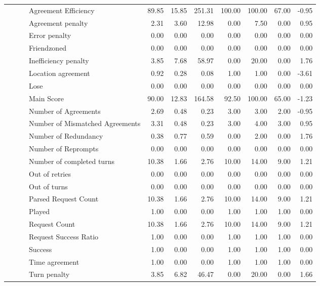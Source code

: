 \begin{tabular}{llllrrrrrrr}
 &  &  & Agreement Efficiency & 89.85 & 15.85 & 251.31 & 100.00 & 100.00 & 67.00 & -0.95 \\
 &  &  & Agreement penalty & 2.31 & 3.60 & 12.98 & 0.00 & 7.50 & 0.00 & 0.95 \\
 &  &  & Error penalty & 0.00 & 0.00 & 0.00 & 0.00 & 0.00 & 0.00 & 0.00 \\
 &  &  & Friendzoned & 0.00 & 0.00 & 0.00 & 0.00 & 0.00 & 0.00 & 0.00 \\
 &  &  & Inefficiency penalty & 3.85 & 7.68 & 58.97 & 0.00 & 20.00 & 0.00 & 1.76 \\
 &  &  & Location agreement & 0.92 & 0.28 & 0.08 & 1.00 & 1.00 & 0.00 & -3.61 \\
 &  &  & Lose & 0.00 & 0.00 & 0.00 & 0.00 & 0.00 & 0.00 & 0.00 \\
 &  &  & Main Score & 90.00 & 12.83 & 164.58 & 92.50 & 100.00 & 65.00 & -1.23 \\
 &  &  & Number of Agreements & 2.69 & 0.48 & 0.23 & 3.00 & 3.00 & 2.00 & -0.95 \\
 &  &  & Number of Mismatched Agreements & 3.31 & 0.48 & 0.23 & 3.00 & 4.00 & 3.00 & 0.95 \\
 &  &  & Number of Redundancy & 0.38 & 0.77 & 0.59 & 0.00 & 2.00 & 0.00 & 1.76 \\
 &  &  & Number of Reprompts & 0.00 & 0.00 & 0.00 & 0.00 & 0.00 & 0.00 & 0.00 \\
 &  &  & Number of completed turns & 10.38 & 1.66 & 2.76 & 10.00 & 14.00 & 9.00 & 1.21 \\
 &  &  & Out of retries & 0.00 & 0.00 & 0.00 & 0.00 & 0.00 & 0.00 & 0.00 \\
 &  &  & Out of turns & 0.00 & 0.00 & 0.00 & 0.00 & 0.00 & 0.00 & 0.00 \\
 &  &  & Parsed Request Count & 10.38 & 1.66 & 2.76 & 10.00 & 14.00 & 9.00 & 1.21 \\
 &  &  & Played & 1.00 & 0.00 & 0.00 & 1.00 & 1.00 & 1.00 & 0.00 \\
 &  &  & Request Count & 10.38 & 1.66 & 2.76 & 10.00 & 14.00 & 9.00 & 1.21 \\
 &  &  & Request Success Ratio & 1.00 & 0.00 & 0.00 & 1.00 & 1.00 & 1.00 & 0.00 \\
 &  &  & Success & 1.00 & 0.00 & 0.00 & 1.00 & 1.00 & 1.00 & 0.00 \\
 &  &  & Time agreement & 1.00 & 0.00 & 0.00 & 1.00 & 1.00 & 1.00 & 0.00 \\
 &  &  & Turn penalty & 3.85 & 6.82 & 46.47 & 0.00 & 20.00 & 0.00 & 1.66 \\

\end{tabular}
